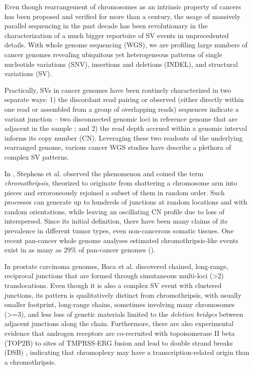 \documentclass[phd,tocprelim]{cornell}
\begin{document}
Even though rearrangement of chromosomes as an intrinsic property of cancers has been proposed \cite{Boveri2008-rl} and verified for more than a century, the usage of massively parallel sequencing in the past decade has been revolutionary in the characterization of a much bigger reportoire of SV events in unprecedented details. With whole genome sequencing (WGS), we are profiling large numbers of cancer genomes revealing ubiquitous yet heterogeneous patterns of single nucleotide variations (SNV), insertions and deletions (INDEL), and structural variations (SV).

Practically, SVs in cancer genomes have been routinely characterized in two separate ways: 1) the discordant read pairing or observed (either directly within one read or assembled from a group of overlapping reads) sequences indicate a variant junction -- two disconnected genomic loci in reference genome that are adjacent in the sample \cite{wala2018,Cameron2017-pz,Rausch2012-ly,Wang2011-lg,Layer2014-xq}; and 2) the read depth accrued within a genomic interval informs its copy number (CN)\cite{Ha2014-ai,Xi2011-oa,Carter2012-xo,Favero2015-hj,Van_Loo2010-ed,Shen2016-fi}. Leveraging these two readouts of the underlying rearranged genome, various cancer WGS studies have describe a plethora of complex SV patterns.

In \cite{stephens2011}, Stephens et al. observed the phenomenon and coined the term \textit{chromothripsis}, theorized to originate from shattering a chromosome arm into pieces and erroroneously rejoined a subset of them in random order. Such processes can generate up to hundreds of junctions at random locations and with random orientations, while leaving an oscillating CN profile due to loss of interspersed. Since its initial definition, there have been many claims of its prevalence in different tumor types, even non-cancerous somatic tissues. One recent pan-cancer whole genome analyses estimated chromothripsis-like events exist in as many as 29\% of pan-cancer genomes (\cite{Cortes-Ciriano2020-fx}).

In prostate carcinoma genomes, Baca et al. \cite{baca2013} discovered chained, long-range, reciprocal junctions that are formed through simutaneous multi-loci (>2) translocations. Even though it is also a complex SV event with clustered junctions, its pattern is qualitatively distinct from chromothripsis, with usually smaller footprint, long-range chains, sometimes involving many chromosomes (>=3), and less loss of genetic materials limited to the \textit{deletion bridges} between adjacent junctions along the chain. Furthermore, there are also experimental evidence that androgen receptors are co-recruited with topoisomerase II beta (TOP2B) to sites of TMPRSS-ERG fusion and lead to double strand breaks (DSB) \cite{Haffner2010-cy}, indicating that chromoplexy may have a transcription-related origin than a chromothripsis.
\end{document}
